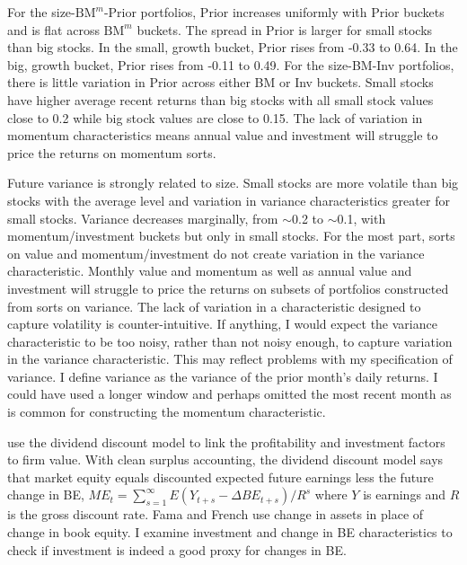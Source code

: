 For the size-$\text{BM}^m$-Prior portfolios, Prior increases uniformly with Prior
buckets and is flat across $\text{BM}^m$ buckets.
The spread in Prior is larger for small stocks than big stocks.
In the small, growth bucket, Prior rises from -0.33 to 0.64.
In the big, growth bucket, Prior rises from -0.11 to 0.49.
For the size-BM-Inv portfolios, there is little variation in Prior across either
BM or Inv buckets.
Small stocks have higher average recent returns than big stocks with all small
stock values close to 0.2 while big stock values are close to 0.15.
The lack of variation in momentum characteristics means annual value and
investment will struggle to price the returns on momentum sorts.

Future variance is strongly related to size. Small stocks are more volatile
than big stocks with the average level and variation in variance
characteristics greater for small stocks.
Variance decreases marginally, from $\sim$0.2 to $\sim$0.1,
with momentum/investment buckets but only in small stocks.
For the most part, sorts on value and momentum/investment do not create
variation in the variance characteristic.
Monthly value and momentum as well as annual value and investment will struggle
to price the returns on subsets of portfolios constructed from sorts on variance.
The lack of variation in a characteristic designed to
capture volatility is counter-intuitive.
If anything, I would expect the variance characteristic to be too noisy,
rather than not noisy enough, to capture variation in the variance
characteristic.
This may reflect problems with my specification of variance.
I define variance as the variance of the prior month's daily returns.
I could have used a longer window and perhaps omitted the most recent month as
is common for constructing the momentum characteristic.

\textcite{fama2006profitability} use the dividend discount model to link the
profitability and investment factors to firm value.
With clean surplus accounting, the dividend discount model says that market
equity equals discounted expected future earnings less the future change in BE,
$ME_t = \sum_{s=1}^\infty E(Y_{t+s}-\Delta BE_{t+s})/R^s$
where $Y$ is earnings and $R$ is the gross discount rate.
Fama and French use change in assets in place of change in book equity.
I examine investment and change in BE characteristics to check if
investment is indeed a good proxy for changes in BE.

